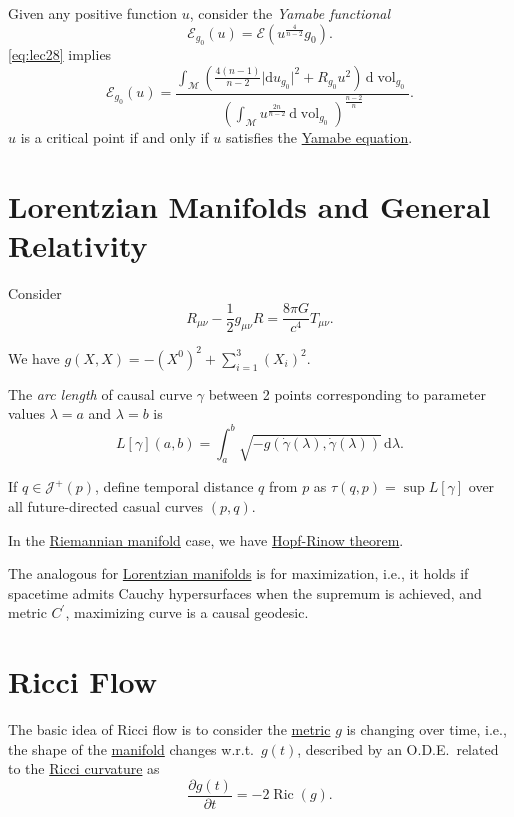 Given any positive function \(u\), consider the \emph{Yamabe functional}
\[
	\mathcal{E} _{g_0}(u) = \mathcal{E} (u^{\frac{4}{n-2}} g_0).
\]
\autoref{eq:lec28} implies
\[
	\mathcal{E} _{g_0}(u) = \frac{\int _\mathcal{M} \left( \frac{4(n-1)}{n-2}\vert \mathrm{d} u_{g_0} \vert ^2 + R_{g_0}u^2 \right) \,\mathrm{d} \mathop{\mathrm{vol}}_{g_0} }{\left( \int _\mathcal{M} u^{\frac{2n}{n-2}} \,\mathrm{d} \mathop{\mathrm{vol}}_{g_0} \right) ^{\frac{n-2}{n}}}.
\]
\(u\) is a critical point if and only if \(u\) satisfies the \hyperref[eq:Yamabe]{Yamabe equation}.

\section{Lorentzian Manifolds and General Relativity}
Consider
\[
	R_{\mu \nu } - \frac{1}{2}g_{\mu \nu } R = \frac{8 \pi G}{c^4} T_{\mu \nu }.
\]

\begin{remark}
	We have \(g(X, X) = -(X^0)^2 + \sum_{i=1}^3 (X_i)^2\).
\end{remark}

\begin{definition}
	The \emph{arc length} of causal curve \(\gamma \) between 2 points corresponding to parameter values \(\lambda = a\) and \(\lambda = b\) is
	\[
		L[\gamma ](a, b) = \int_{a}^{b} \sqrt{-g(\dot{\gamma }(\lambda ), \dot{\gamma }(\lambda )  )} \,\mathrm{d}\lambda .
	\]
\end{definition}

If \(q\in \mathcal{J} ^+(p)\), define temporal distance \(q\) from \(p\) as \(\tau (q, p) = \sup L[\gamma ]\) over  all future-directed casual curves \((p, q)\).

\begin{prev}
	In the \hyperref[def:Riemannian-manifold]{Riemannian manifold} case, we have \hyperref[thm:Hopf-Rinow]{Hopf-Rinow theorem}.
\end{prev}

The analogous for \hyperref[def:Lorentzian-metric]{Lorentzian manifolds} is for maximization, i.e., it holds if spacetime admits Cauchy hypersurfaces when the supremum is achieved, and metric \(C^{\prime} \), maximizing curve is a causal geodesic.

\section{Ricci Flow}
The basic idea of Ricci flow is to consider the \hyperref[def:Riemannian-metric]{metric} \(g\) is changing over time, i.e., the shape of the \hyperref[def:Riemannian-manifold]{manifold} changes w.r.t.\ \(g(t)\), described by an O.D.E.\ related to the \hyperref[def:Ricci-curvature]{Ricci curvature} as
\[
	\frac{\partial g(t)}{\partial t} = -2 \mathop{\mathrm{Ric}}(g) .
\]